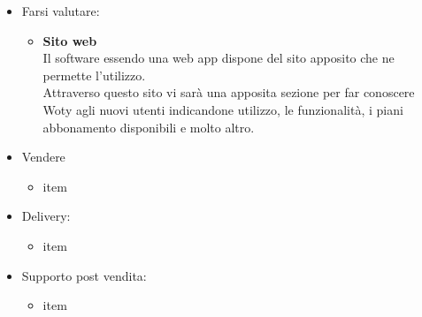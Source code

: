 \begin{itemize}
\begin{itemize}
\end{itemize}

\item Farsi valutare:
\begin{itemize}
\item \textbf{Sito web}\\
Il software essendo una web app dispone del sito apposito che ne permette l'utilizzo.\\
Attraverso questo sito vi sarà una apposita sezione per far conoscere Woty agli nuovi utenti indicandone utilizzo, le funzionalità, i piani abbonamento disponibili e molto altro.\\

\end{itemize}

\item Vendere
\begin{itemize}
\item item
\end{itemize}

\item Delivery:
\begin{itemize}
\item item
\end{itemize}

\item Supporto post vendita:
\begin{itemize}
\item item
\end{itemize}

\end{itemize}

